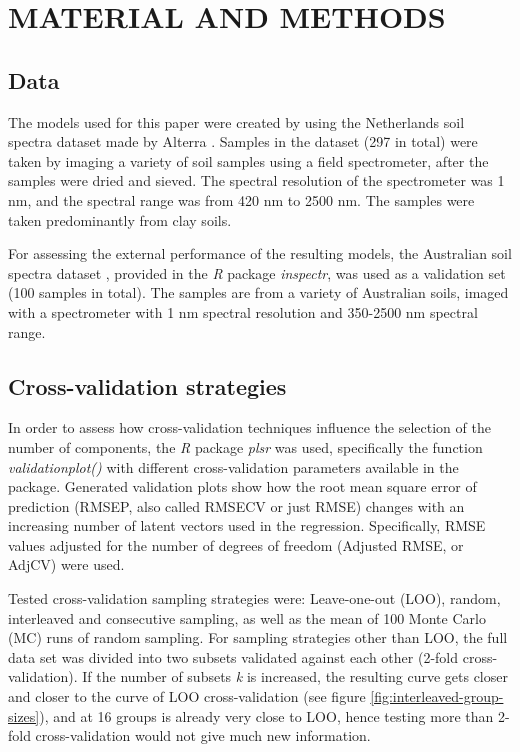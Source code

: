 \documentclass{isprs}
\begin{document}
\section{MATERIAL AND METHODS}\label{sec:METHODS}

\subsection{Data}\label{sec:Data}

The models used for this paper were created by using the Netherlands soil spectra dataset made by Alterra \cite{groenestijn2009}. Samples in the dataset (297 in total) were taken by imaging a variety of soil samples using a field spectrometer, after the samples were dried and sieved. The spectral resolution of the spectrometer was 1 nm, and the spectral range was from 420 nm to 2500 nm. The samples were taken predominantly from clay soils.

For assessing the external performance of the resulting models, the Australian soil spectra dataset \cite{rossel2010using}, provided in the \textit{R} package \textit{inspectr}, was used as a validation set (100 samples in total). The samples are from a variety of Australian soils, imaged with a spectrometer with 1 nm spectral resolution and 350-2500 nm spectral range.

\subsection{Cross-validation strategies}\label{sec:Cross-validation strategies}

In order to assess how cross-validation techniques influence the selection of the number of components, the \textit{R} package \textit{plsr} was used, specifically the function \textit{validationplot()} with different cross-validation parameters available in the package. Generated validation plots show how the root mean square error of prediction (RMSEP, also called RMSECV or just RMSE) changes with an increasing number of latent vectors used in the regression. Specifically, RMSE values adjusted for the number of degrees of freedom (Adjusted RMSE, or AdjCV) were used.

Tested cross-validation sampling strategies were: Leave-one-out (LOO), random, interleaved and consecutive sampling, as well as the mean of 100 Monte Carlo (MC) runs of random sampling. For sampling strategies other than LOO, the full data set was divided into two subsets validated against each other (2-fold cross-validation). If the number of subsets \textit{k} is increased, the resulting curve gets closer and closer to the curve of LOO cross-validation (see figure \ref{fig:interleaved-group-sizes}), and at 16 groups is already very close to LOO, hence testing more than 2-fold cross-validation would not give much new information.
\end{document}
